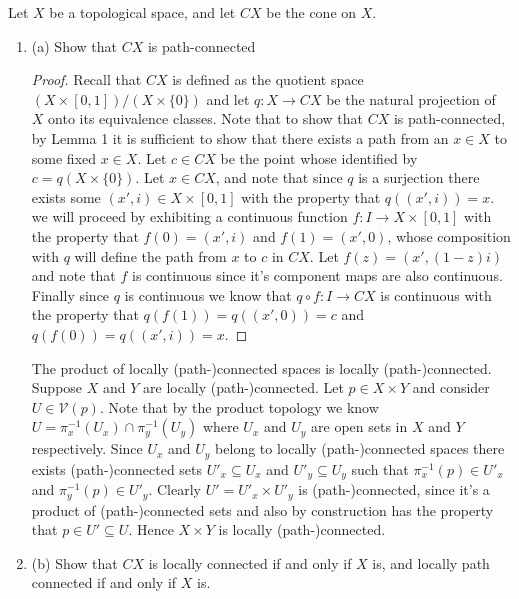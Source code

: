 \documentclass{homework651}
\begin{document}
\begin{problems}
\problem Let $X$ be a topological space, and let $CX$ be the cone on $X$. 
\begin{enumerate}
    \item{(a)} Show that $CX$ is path-connected
    \begin{proof} Recall that $CX$ is defined as the quotient space $(X \times [0, 1])/(X \times \{0\})$ and let $q: X \to CX$ be the natural projection of $X$ onto its equivalence classes. Note that to show that $CX$ is path-connected, by Lemma 1 it is sufficient to show that there exists a path from an $x \in X$ to some fixed $x \in X$. Let $c \in CX$ be the point whose identified by $c = q(X \times \{0\})$. Let $x \in CX$, and note that since $q$ is a surjection there exists some $(x', i) \in X \times [0, 1]$ with the property that $q((x', i)) = x$. we will proceed by exhibiting a continuous function $f: I \to X \times [0, 1]$ with the property that $f(0) = (x', i)$ and $f(1) = (x', 0)$, whose composition with $q$ will define the path from $x$ to $c$ in $CX$. Let $f(z) = (x',(1 - z)i)$ and note that $f$ is continuous since it's component maps are also continuous. Finally since $q$ is continuous we know that $q\circ f: I \to CX$ is continuous with the property that $q(f(1)) = q((x', 0)) = c$ and $q(f(0)) = q((x', i)) = x$. 
    \end{proof}



    \begin{lemma}{2} The product of locally (path-)connected spaces is locally (path-)connected. 
        Suppose $X$ and $Y$ are locally (path-)connected. Let $p \in X \times Y$ and consider $U \in \mathcal{V}(p)$. Note that by the product topology we know $U = \pi_x^{-1}(U_x) \cap \pi_y^{-1}(U_y)$ where $U_x$ and $U_y$ are open sets in $X$ and $Y$ respectively. Since $U_x$ and $U_y$ belong to locally (path-)connected spaces there exists (path-)connected sets $U'_x \subseteq U_x$ and $U'_y \subseteq U_y$ such that $\pi_x^{-1}(p) \in U'_x$ and $\pi_y^{-1}(p) \in U'_y$. Clearly $U' = U'_x \times U'_y$
        is (path-)connected, since it's a product of (path-)connected sets and also by construction has the property that $p \in U' \subseteq U$. Hence $X \times Y$ is locally (path-)connected. 
    \end{lemma}

    \item{(b)} Show that $CX$ is locally connected if and only if $X$ is, and locally path connected if and only if $X$ is. 


\end{enumerate}
\end{problems}
\end{document}
